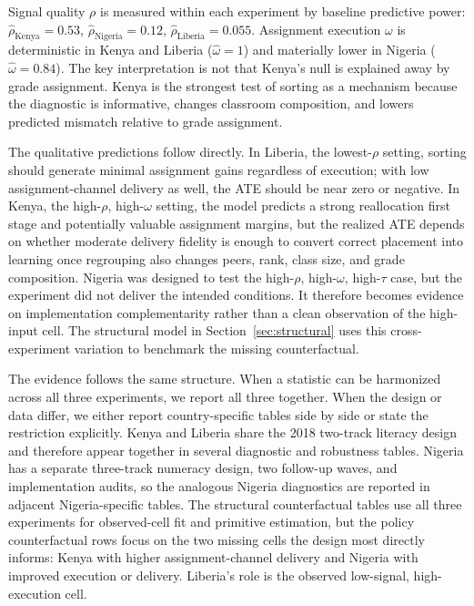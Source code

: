 \documentclass[11pt]{article}
\begin{document}
Signal quality $\rho$ is measured within each experiment by baseline predictive power: $\hat{\rho}_{\text{Kenya}} = 0.53$, $\hat{\rho}_{\text{Nigeria}} = 0.12$, $\hat{\rho}_{\text{Liberia}} = 0.055$. Assignment execution $\omega$ is deterministic in Kenya and Liberia ($\hat{\omega} = 1$) and materially lower in Nigeria ($\hat{\omega} = 0.84$). The key interpretation is not that Kenya's null is explained away by grade assignment. Kenya is the strongest test of sorting as a mechanism because the diagnostic is informative, changes classroom composition, and lowers predicted mismatch relative to grade assignment.

The qualitative predictions follow directly. In Liberia, the lowest-$\rho$ setting, sorting should generate minimal assignment gains regardless of execution; with low assignment-channel delivery as well, the ATE should be near zero or negative. In Kenya, the high-$\rho$, high-$\omega$ setting, the model predicts a strong reallocation first stage and potentially valuable assignment margins, but the realized ATE depends on whether moderate delivery fidelity is enough to convert correct placement into learning once regrouping also changes peers, rank, class size, and grade composition. Nigeria was designed to test the high-$\rho$, high-$\omega$, high-$\tau$ case, but the experiment did not deliver the intended conditions. It therefore becomes evidence on implementation complementarity rather than a clean observation of the high-input cell. The structural model in Section~\ref{sec:structural} uses this cross-experiment variation to benchmark the missing counterfactual.

The evidence follows the same structure. When a statistic can be harmonized across all three experiments, we report all three together. When the design or data differ, we either report country-specific tables side by side or state the restriction explicitly. Kenya and Liberia share the 2018 two-track literacy design and therefore appear together in several diagnostic and robustness tables. Nigeria has a separate three-track numeracy design, two follow-up waves, and implementation audits, so the analogous Nigeria diagnostics are reported in adjacent Nigeria-specific tables. The structural counterfactual tables use all three experiments for observed-cell fit and primitive estimation, but the policy counterfactual rows focus on the two missing cells the design most directly informs: Kenya with higher assignment-channel delivery and Nigeria with improved execution or delivery. Liberia's role is the observed low-signal, high-execution cell.
\end{document}
